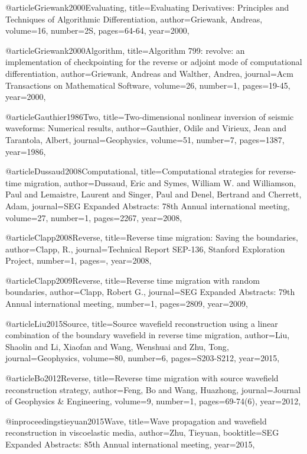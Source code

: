 @article{Griewank2000Evaluating,
  title={Evaluating Derivatives: Principles and Techniques of Algorithmic Differentiation},
  author={Griewank, Andreas},
  volume={16},
  number={2S},
  pages={64-64},
  year={2000},
}

@article{Griewank2000Algorithm,
  title={Algorithm 799: revolve: an implementation of checkpointing for the reverse or adjoint mode of computational differentiation},
  author={Griewank, Andreas and Walther, Andrea},
  journal={Acm Transactions on Mathematical Software},
  volume={26},
  number={1},
  pages={19-45},
  year={2000},
}

@article{Gauthier1986Two,
  title={Two‐dimensional nonlinear inversion of seismic waveforms: Numerical results},
  author={Gauthier, Odile and Virieux, Jean and Tarantola, Albert},
  journal={Geophysics},
  volume={51},
  number={7},
  pages={1387},
  year={1986},
}

@article{Dussaud2008Computational,
  title={Computational strategies for reverse-time migration},
  author={Dussaud, Eric and Symes, William W. and Williamson, Paul and Lemaistre, Laurent and Singer, Paul and Denel, Bertrand and Cherrett, Adam},
  journal={SEG Expanded Abstracts: 78th Annual international meeting},
  volume={27},
  number={1},
  pages={2267},
  year={2008},
}

@article{Clapp2008Reverse,
  title={Reverse time migration: Saving the boundaries},
  author={Clapp, R.},
  journal={Technical Report SEP-136, Stanford Exploration Project},
  number={1},
  pages={},
  year={2008},
}

@article{Clapp2009Reverse,
  title={Reverse time migration with random boundaries},
  author={Clapp, Robert G.},
  journal={SEG Expanded Abstracts: 79th Annual international meeting},
  number={1},
  pages={2809},
  year={2009},
}

@article{Liu2015Source,
  title={Source wavefield reconstruction using a linear combination of the boundary wavefield in reverse time migration},
  author={Liu, Shaolin and Li, Xiaofan and Wang, Wenshuai and Zhu, Tong},
  journal={Geophysics},
  volume={80},
  number={6},
  pages={S203-S212},
  year={2015},
}

@article{Bo2012Reverse,
  title={Reverse time migration with source wavefield reconstruction strategy},
  author={Feng, Bo and Wang, Huazhong},
  journal={Journal of Geophysics \& Engineering},
  volume={9},
  number={1},
  pages={69-74(6)},
  year={2012},
}

@inproceedings{tieyuan2015Wave,
  title={Wave propagation and wavefield reconstruction in viscoelastic media},
  author={Zhu, Tieyuan},
  booktitle={SEG Expanded Abstracts: 85th Annual international meeting},
  year={2015},
}

